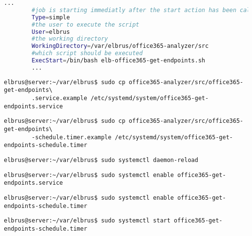 	\lstset{style=files}
	\begin{lstlisting}[caption={uptime\_monitor.service.example - Die Variable 'WorkingDirectory' sowie die Variable 'User' anpassen.},language=bash ,keywords={WorkingDirectory, User}, keywordstyle=\color{red}, firstnumber=4]
		...
		#job is starting immediatly after the start action has been called
		Type=simple
		#the user to execute the script
		User=elbrus
		#the working directory
		WorkingDirectory=/var/elbrus/office365-analyzer/src
		#which script should be executed
		ExecStart=/bin/bash elb-office365-get-endpoints.sh
		...
	\end{lstlisting}
	
	\lstset{style=commands}
	\begin{lstlisting}[caption={Kopieren des Serviceprogrammes.}]
		elbrus@server:~/var/elbrus$ sudo cp office365-analyzer/src/office365-get-endpoints\
		.service.example /etc/systemd/system/office365-get-endpoints.service
	\end{lstlisting}
	
	\lstset{style=commands}
	\begin{lstlisting}[caption={Kopieren des Zeitplanungsprogrammes.}]
		elbrus@server:~/var/elbrus$ sudo cp office365-analyzer/src/office365-get-endpoints\
		-schedule.timer.example /etc/systemd/system/office365-get-endpoints-schedule.timer
	\end{lstlisting}
	
	\lstset{style=commands}
	\begin{lstlisting}[caption={Neuladen des 'systemctl' Deamons.}]
		elbrus@server:~/var/elbrus$ sudo systemctl daemon-reload
	\end{lstlisting}
	
	\lstset{style=commands}
	\begin{lstlisting}[caption={Aktivieren des Serviceprogrammes.}]
		elbrus@server:~/var/elbrus$ sudo systemctl enable office365-get-endpoints.service
	\end{lstlisting}
	
	\lstset{style=commands}
	\begin{lstlisting}[caption={Aktivieren des Zeitplanungsprogrammes.}]
		elbrus@server:~/var/elbrus$ sudo systemctl enable office365-get-endpoints-schedule.timer
	\end{lstlisting}
	
	\lstset{style=commands}
	\begin{lstlisting}[caption={Starten des Zeitplanungsprogrammes.}]
		elbrus@server:~/var/elbrus$ sudo systemctl start office365-get-endpoints-schedule.timer
	\end{lstlisting}